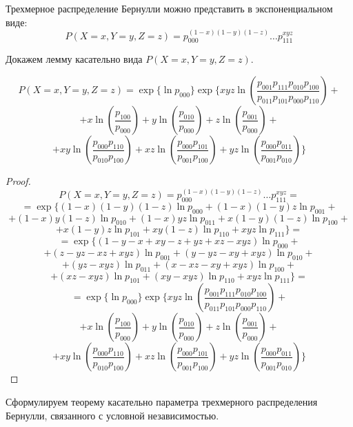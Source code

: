 Трехмерное распределение Бернулли можно представить в экспоненциальном виде:
$$P(X=x,Y=y,Z=z)=p_{000}^{(1-x)(1-y)(1-z)} \ldots p_{111}^{x y z}$$

Докажем лемму касательно вида $P(X=x,Y=y,Z=z)$.

\begin{lemma}\label{factorization}
    $$
    P(X=x,Y=y,Z=z)= \exp \Biggl\{ \ln p_{000} \Biggr\}
        \exp \Biggl\{  xyz \ln  \left(\dfrac{p_{001}p_{111}p_{010}p_{100}}{p_{011}p_{101}p_{000}p_{110}}\right) +$$
    $$ +
        x \ln\left(\dfrac{p_{100}}{p_{000}}\right) +  y \ln\left(\dfrac{p_{010}}{p_{000}}\right) +
        z \ln\left(\dfrac{p_{001}}{p_{000}}\right) +
    $$
    $$
        + xy \ln \left(\dfrac{p_{000}p_{110}}{p_{010}p_{100}}\right) +
        xz \ln \left(\dfrac{p_{000}p_{101}}{p_{001}p_{100}}\right) +
        yz \ln \left(\dfrac{p_{000}p_{011}}{p_{001}p_{010}}\right) \Biggr\}
    $$
\end{lemma}

\begin{proof}
    $$
    P(X=x,Y=y,Z=z) = p_{000}^{(1-x)(1-y)(1-z)} \ldots p_{111}^{x y z} =
    $$
    $$
        =\exp \Biggl\{ (1-x)(1-y)(1-z) \ln p_{000} +
        (1-x)(1-y)z \ln p_{001}+
    $$
    $$
        + (1-x)y(1-z) \ln p_{010} + (1-x)y z \ln p_{011} +  x(1-y)(1-z) \ln p_{100} +
    $$
    $$
        +   x(1-y) z \ln p_{101}
        +   x y (1-z) \ln p_{110} +   x y z \ln p_{111} \Biggr\} =
    $$
    $$
        =\exp \Biggl\{   ( 1 - y -  x +  x y
        -  z +  y z +  x z -  x y z ) \ln p_{000} +
    $$
    $$
        +    (z -  y z -  x z +  x y z) \ln p_{001}  +
          (y -  y z -  x y +  x y z)  \ln p_{010} +
    $$
    $$
        +    (y z -  x y z ) \ln p_{011} +
           (x -  x z -  x y +  x y z ) \ln p_{100} +
    $$
    $$
        +   (x z -  x y z ) \ln p_{101} +   (x y -  x y z) \ln p_{110} +
          x y z \ln p_{111} \Biggr\}=
    $$
    $$
        = \exp \Biggl\{ \ln p_{000} \Biggr\}
        \exp \Biggl\{  xyz \ln  \left(\dfrac{p_{001}p_{111}p_{010}p_{100}}{p_{011}p_{101}p_{000}p_{110}}\right) +$$
    $$ +
        x \ln\left(\dfrac{p_{100}}{p_{000}}\right) +  y \ln\left(\dfrac{p_{010}}{p_{000}}\right) +
        z \ln\left(\dfrac{p_{001}}{p_{000}}\right) +
    $$
    $$
        + xy \ln \left(\dfrac{p_{000}p_{110}}{p_{010}p_{100}}\right) +
        xz \ln \left(\dfrac{p_{000}p_{101}}{p_{001}p_{100}}\right) +
        yz \ln \left(\dfrac{p_{000}p_{011}}{p_{001}p_{010}}\right) \Biggr\}
    $$
\end{proof}

Сформулируем теорему касательно параметра трехмерного распределения Бернулли, связанного с условной независимостью.

